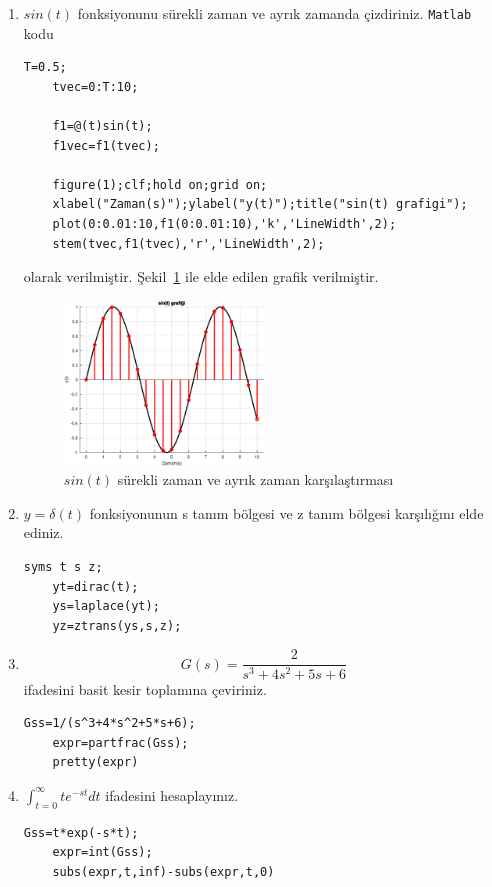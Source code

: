 \begin{enumerate}
    \item $sin(t)$ fonksiyonunu sürekli zaman ve ayrık zamanda çizdiriniz.
    \verb|Matlab| kodu
    \begin{lstlisting}[style=Matlab-editor]
    T=0.5;
    tvec=0:T:10;

    f1=@(t)sin(t);
    f1vec=f1(tvec);

    figure(1);clf;hold on;grid on;
    xlabel("Zaman(s)");ylabel("y(t)");title("sin(t) grafigi");
    plot(0:0.01:10,f1(0:0.01:10),'k','LineWidth',2);
    stem(tvec,f1(tvec),'r','LineWidth',2);
    \end{lstlisting}
    olarak verilmiştir. Şekil~\ref{fig:lec1_plot1} ile elde edilen grafik verilmiştir.
    \begin{figure}[!htb]
        \centering
        \includegraphics[width=0.5\textwidth]{img/lec1_plot1}
        \caption{$sin(t)$ sürekli zaman ve ayrık zaman karşılaştırması}
        \label{fig:lec1_plot1}
    \end{figure}
    \item $y=\delta(t)$ fonksiyonunun s tanım bölgesi ve z tanım bölgesi karşılığını elde ediniz.
    \begin{lstlisting}[style=Matlab-editor]
    syms t s z;
    yt=dirac(t);
    ys=laplace(yt);
    yz=ztrans(ys,s,z);
    \end{lstlisting}
    \item 
    \begin{equation}
        G(s)=\frac{2}{s^3+4s^2+5s+6}
    \end{equation}
    ifadesini basit kesir toplamına çeviriniz.
    \begin{lstlisting}[style=Matlab-editor]
    Gss=1/(s^3+4*s^2+5*s+6);
    expr=partfrac(Gss);
    pretty(expr)
    \end{lstlisting}
    \item $\int_{t=0}^{\infty} te^{-st}dt$ ifadesini hesaplayınız.
    \begin{lstlisting}[style=Matlab-editor]
    Gss=t*exp(-s*t);
    expr=int(Gss);
    subs(expr,t,inf)-subs(expr,t,0)
    \end{lstlisting}
\end{enumerate}